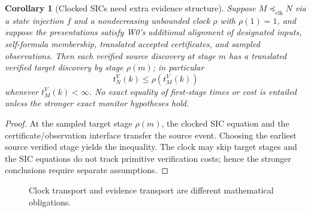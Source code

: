 \documentclass[11pt,letterpaper]{article}
\newtheorem{corollary}[theorem]{Corollary}
\begin{document}
\begin{corollary}[Clocked SICs need extra evidence structure]\label{cor:clock}
Suppose $M\preceq_{\mathrm{clk}}N$ via a state injection $f$ and a nondecreasing unbounded clock $\rho$ with $\rho(1)=1$, and suppose the presentations satisfy W0's additional alignment of designated inputs, self-formula membership, translated accepted certificates, and sampled observations. Then each verified source discovery at stage $m$ has a translated verified target discovery by stage $\rho(m)$; in particular
\[
 t_N^{V}(k)\le\rho(t_M^{V}(k))
\]
whenever $t_M^V(k)<\infty$. No exact equality of first-stage times or cost is entailed unless the stronger exact monitor hypotheses hold.
\end{corollary}
\begin{proof}
At the sampled target stage $\rho(m)$, the clocked SIC equation and the certificate/observation interface transfer the source event. Choosing the earliest source verified stage yields the inequality. The clock may skip target stages and the SIC equations do not track primitive verification costs; hence the stronger conclusions require separate assumptions.
\end{proof}
\begin{figure}[htbp]\centering
{}
\caption{Clock transport and evidence transport are different mathematical obligations.}\label{fig:transport}
\end{figure}
\end{document}
